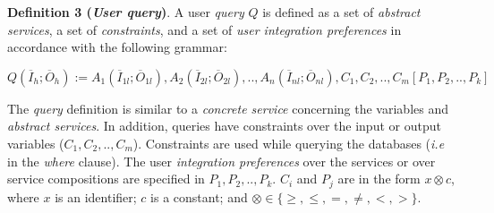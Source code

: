 
\bigskip

\noindent \textbf{Definition 3 (\textit{User query})}.
A user \textit{query} $Q$ is defined as a set of \textit{abstract services}, a set of \textit{constraints}, and a set of \textit{user integration preferences} in accordance with the following grammar:
%
\begin{center}
\small
\begin{math}
Q (\overline{I}_{h}; \overline{O}_{h}) := A_{1}(\overline{I}_{1l};
\overline{O}_{1l}), A_{2}(\overline{I}_{2l}; \overline{O}_{2l}), ..,  A_{n}(\overline{I}_{nl}; \overline{O}_{nl}),C_{1},C_{2}, .., C_{m}[P_{1},P_{2}, .., P_{k}]
\end{math}
\end{center}
%
The \textit{query} definition is similar to a \textit{concrete service} concerning the variables and \textit{abstract services}. In addition, queries have constraints over the input or output variables ($C_{1}, C_{2}, .., C_{m}$). Constraints are used while querying the databases (\textit{i.e} in the \textit{where} clause). The user \textit{integration preferences} over the services or over service compositions are specified in $P_{1}, P_{2}, .., P_{k}$. $C_{i}$ and $P_{j}$ are in the form $x \otimes c$, where $x$ is an identifier; $c$ is a constant; and $\otimes \in\lbrace \geq, \leq, =, \neq, <, >\rbrace$.
%

